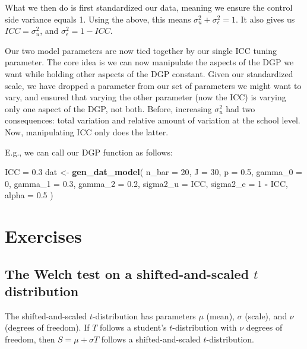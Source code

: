 \documentclass[
]{book}
\newenvironment{Shaded}{\begin{snugshade}}{\end{snugshade}}
\newcommand{\AttributeTok}[1]{\textcolor[rgb]{0.13,0.29,0.53}{#1}}
\newcommand{\DecValTok}[1]{\textcolor[rgb]{0.00,0.00,0.81}{#1}}
\newcommand{\FloatTok}[1]{\textcolor[rgb]{0.00,0.00,0.81}{#1}}
\newcommand{\FunctionTok}[1]{\textcolor[rgb]{0.13,0.29,0.53}{\textbf{#1}}}
\newcommand{\NormalTok}[1]{#1}
\newcommand{\OtherTok}[1]{\textcolor[rgb]{0.56,0.35,0.01}{#1}}
\newcommand{\SpecialCharTok}[1]{\textcolor[rgb]{0.81,0.36,0.00}{\textbf{#1}}}
\begin{document}
What we then do is first standardized our data, meaning we ensure the control side variance equals 1.
Using the above, this means \(\sigma^2_u + \sigma^2_\epsilon = 1\).
It also gives us \(ICC = \sigma^2_u\), and \(\sigma^2_\epsilon = 1 - ICC\).

Our two model parameters are now tied together by our single ICC tuning parameter.
The core idea is we can now manipulate the aspects of the DGP we want while holding other aspects of the DGP constant.
Given our standardized scale, we have dropped a parameter from our set of parameters we might want to vary, and ensured that varying the other parameter (now the ICC) is varying only one aspect of the DGP, not both.
Before, increasing \(\sigma^2_u\) had two consequences: total variation and relative amount of variation at the school level.
Now, manipulating ICC only does the latter.

E.g., we can call our DGP function as follows:

\begin{Shaded}
\begin{Highlighting}[]
\NormalTok{ICC }\OtherTok{=} \FloatTok{0.3}
\NormalTok{dat }\OtherTok{\textless{}{-}} \FunctionTok{gen\_dat\_model}\NormalTok{( }\AttributeTok{n\_bar =} \DecValTok{20}\NormalTok{, }\AttributeTok{J =} \DecValTok{30}\NormalTok{, }\AttributeTok{p =} \FloatTok{0.5}\NormalTok{,}
                      \AttributeTok{gamma\_0 =} \DecValTok{0}\NormalTok{, }\AttributeTok{gamma\_1 =} \FloatTok{0.3}\NormalTok{, }\AttributeTok{gamma\_2 =} \FloatTok{0.2}\NormalTok{,}
                      \AttributeTok{sigma2\_u =}\NormalTok{ ICC, }\AttributeTok{sigma2\_e =} \DecValTok{1} \SpecialCharTok{{-}}\NormalTok{ ICC,}
                      \AttributeTok{alpha =} \FloatTok{0.5}\NormalTok{ )}
\end{Highlighting}
\end{Shaded}

\section{Exercises}\label{exercises-2}

\subsection{\texorpdfstring{The Welch test on a shifted-and-scaled \(t\) distribution}{The Welch test on a shifted-and-scaled t distribution}}\label{ex_dgp}

The shifted-and-scaled \(t\)-distribution has parameters \(\mu\) (mean), \(\sigma\) (scale), and \(\nu\) (degrees of freedom).
If \(T\) follows a student's \(t\)-distribution with \(\nu\) degrees of freedom, then \(S = \mu + \sigma T\) follows a shifted-and-scaled \(t\)-distribution.
\end{document}
